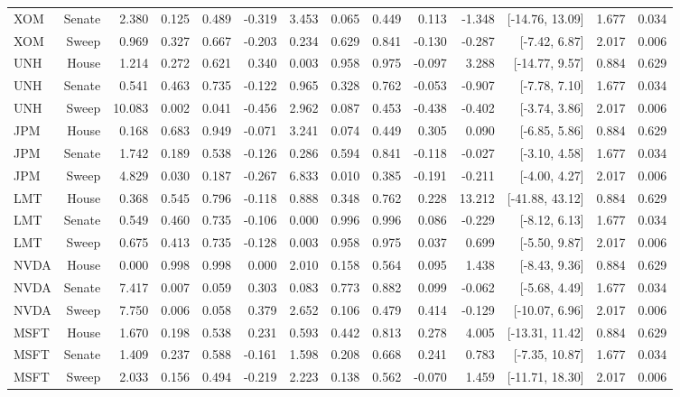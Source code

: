 \begin{table}[htbp]
\begin{tabular}{lrrrrrrrrrrrrr}
XOM & Senate & 2.380 & 0.125 & 0.489 & -0.319 & 3.453 & 0.065 & 0.449 & 0.113 & -1.348 & [-14.76, 13.09] & 1.677 & 0.034 \\
XOM & Sweep & 0.969 & 0.327 & 0.667 & -0.203 & 0.234 & 0.629 & 0.841 & -0.130 & -0.287 & [-7.42, 6.87] & 2.017 & 0.006 \\
UNH & House & 1.214 & 0.272 & 0.621 & 0.340 & 0.003 & 0.958 & 0.975 & -0.097 & 3.288 & [-14.77, 9.57] & 0.884 & 0.629 \\
UNH & Senate & 0.541 & 0.463 & 0.735 & -0.122 & 0.965 & 0.328 & 0.762 & -0.053 & -0.907 & [-7.78, 7.10] & 1.677 & 0.034 \\
UNH & Sweep & 10.083 & 0.002 & 0.041 & -0.456 & 2.962 & 0.087 & 0.453 & -0.438 & -0.402 & [-3.74, 3.86] & 2.017 & 0.006 \\
JPM & House & 0.168 & 0.683 & 0.949 & -0.071 & 3.241 & 0.074 & 0.449 & 0.305 & 0.090 & [-6.85, 5.86] & 0.884 & 0.629 \\
JPM & Senate & 1.742 & 0.189 & 0.538 & -0.126 & 0.286 & 0.594 & 0.841 & -0.118 & -0.027 & [-3.10, 4.58] & 1.677 & 0.034 \\
JPM & Sweep & 4.829 & 0.030 & 0.187 & -0.267 & 6.833 & 0.010 & 0.385 & -0.191 & -0.211 & [-4.00, 4.27] & 2.017 & 0.006 \\
LMT & House & 0.368 & 0.545 & 0.796 & -0.118 & 0.888 & 0.348 & 0.762 & 0.228 & 13.212 & [-41.88, 43.12] & 0.884 & 0.629 \\
LMT & Senate & 0.549 & 0.460 & 0.735 & -0.106 & 0.000 & 0.996 & 0.996 & 0.086 & -0.229 & [-8.12, 6.13] & 1.677 & 0.034 \\
LMT & Sweep & 0.675 & 0.413 & 0.735 & -0.128 & 0.003 & 0.958 & 0.975 & 0.037 & 0.699 & [-5.50, 9.87] & 2.017 & 0.006 \\
NVDA & House & 0.000 & 0.998 & 0.998 & 0.000 & 2.010 & 0.158 & 0.564 & 0.095 & 1.438 & [-8.43, 9.36] & 0.884 & 0.629 \\
NVDA & Senate & 7.417 & 0.007 & 0.059 & 0.303 & 0.083 & 0.773 & 0.882 & 0.099 & -0.062 & [-5.68, 4.49] & 1.677 & 0.034 \\
NVDA & Sweep & 7.750 & 0.006 & 0.058 & 0.379 & 2.652 & 0.106 & 0.479 & 0.414 & -0.129 & [-10.07, 6.96] & 2.017 & 0.006 \\
MSFT & House & 1.670 & 0.198 & 0.538 & 0.231 & 0.593 & 0.442 & 0.813 & 0.278 & 4.005 & [-13.31, 11.42] & 0.884 & 0.629 \\
MSFT & Senate & 1.409 & 0.237 & 0.588 & -0.161 & 1.598 & 0.208 & 0.668 & 0.241 & 0.783 & [-7.35, 10.87] & 1.677 & 0.034 \\
MSFT & Sweep & 2.033 & 0.156 & 0.494 & -0.219 & 2.223 & 0.138 & 0.562 & -0.070 & 1.459 & [-11.71, 18.30] & 2.017 & 0.006 \\

\end{tabular}
\end{table}
